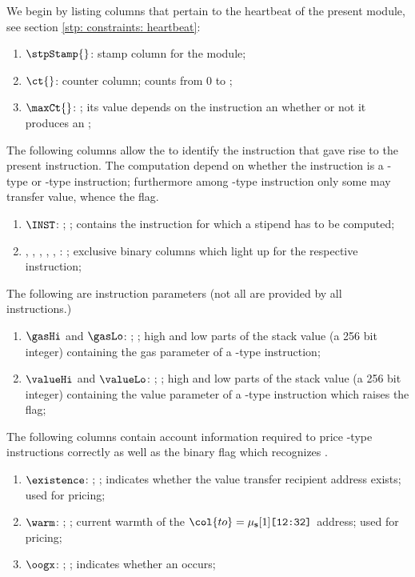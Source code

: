 We begin by listing columns that pertain to the heartbeat of the present module, see section \ref{stp: constraints: heartbeat}:
\begin{enumerate}
	\item $\stpStamp{}$:
		stamp column for the \stpMod{} module; 
	\item $\ct{}$:
		counter column; counts from 0 to \maxCt{};
	\item $\maxCt{}$:
		\ccc{}; its value depends on the instruction an whether or not it produces an \oogxSH{};
\end{enumerate}
The following columns allow the \stpMod{} to identify the instruction that gave rise to the present instruction. The computation depend on whether the instruction is a -type or -type instruction; furthermore among -type instruction only some may transfer value, whence the \cctv{} flag. 
\begin{enumerate}[resume]
	\item $\INST$: \godGiven{};
		\ccc{}; contains the instruction for which a stipend has to be computed;
	\item \stpCreate, \stpCreateTwo, \stpCall, \stpCallCode, \stpDelegateCall, \stpStaticCall:
		\ccbc{}; exclusive binary columns which light up for the respective instruction; 
\end{enumerate}
The following are instruction parameters (not all are provided by all instructions.) 
\begin{enumerate}[resume]
	\item $\gasHi$ and $\gasLo$: \godGiven{};
		\ccc{}; high and low parts of the stack value (a 256 bit integer) containing the gas parameter of a -type instruction;
	\item $\valueHi$ and $\valueLo$: \godGiven{};
		\ccc{}; high and low parts of the stack value (a 256 bit integer) containing the value parameter of a -type instruction which raises the \cctv{} flag;
\end{enumerate}
The following columns contain account information required to price -type instructions correctly as well as the binary flag which recognizes \oogxSH{}.
\begin{enumerate}[resume]
	\item $\existence$: \godGiven{};
		\ccbc{}; indicates whether the value transfer recipient address exists; used for  pricing;
	\item $\warm$: \godGiven{};
		\ccbc{}; current warmth of the $\col{to} = \mu_\textbf{s}[1]\texttt{[12:32]}$ address; used for  pricing;
	\item $\oogx$: \godGiven{};
		\ccbc{}; indicates whether an \oogxSH{} occurs; 
\end{enumerate}
